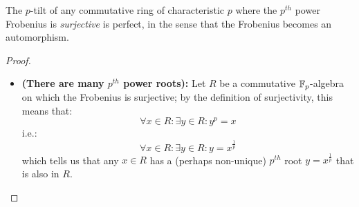                     \begin{lemma} \label{lemma: tilts_are_perfect}
                        The $p$-tilt of any commutative ring of characteristic $p$ where the $p^{th}$ power Frobenius is \textit{surjective} is perfect, in the sense that the Frobenius becomes an automorphism. 
                    \end{lemma}
                        \begin{proof}
                            \noindent
                            \begin{itemize}
                                \item \textbf{(There are many $p^{th}$ power roots):} Let $R$ be a commutative $\mathbb{F}_p$-algebra on which the Frobenius is surjective; by the definition of surjectivity, this means that:
                                    $$\forall x \in R: \exists y \in R: y^p = x$$
                                i.e.:
                                    $$\forall x \in R: \exists y \in R: y = x^{\frac1p}$$
                                which tells us that any $x \in R$ has a (perhaps non-unique) $p^{th}$ root $y = x^{\frac1p}$ that is also in $R$.
                                

\end{itemize}
\end{proof}

